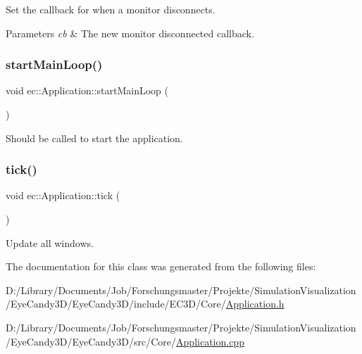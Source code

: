 Set the callback for when a monitor disconnects. 


\begin{DoxyParams}{Parameters}
{\em cb} & The new monitor disconnected callback. \\
\hline
\end{DoxyParams}
\mbox{\label{classec_1_1_application_ad541044a8fc0ff8d6c3fc57220109a50}} 
\subsubsection{\texorpdfstring{start\+Main\+Loop()}{startMainLoop()}}
{\footnotesize\ttfamily void ec\+::\+Application\+::start\+Main\+Loop (\begin{DoxyParamCaption}{ }\end{DoxyParamCaption})\hspace{0.3cm}{\ttfamily [virtual]}}



Should be called to start the application. 

\mbox{\label{classec_1_1_application_a036ae53bcbf708c7a01deb199feeccdf}} 
\subsubsection{\texorpdfstring{tick()}{tick()}}
{\footnotesize\ttfamily void ec\+::\+Application\+::tick (\begin{DoxyParamCaption}{ }\end{DoxyParamCaption})\hspace{0.3cm}{\ttfamily [virtual]}}



Update all windows. 



The documentation for this class was generated from the following files\+:\begin{DoxyCompactItemize}
\item 
D\+:/\+Library/\+Documents/\+Job/\+Forschungsmaster/\+Projekte/\+Simulation\+Visualization/\+Eye\+Candy3\+D/\+Eye\+Candy3\+D/include/\+E\+C3\+D/\+Core/\mbox{\hyperlink{_application_8h}{Application.\+h}}\item 
D\+:/\+Library/\+Documents/\+Job/\+Forschungsmaster/\+Projekte/\+Simulation\+Visualization/\+Eye\+Candy3\+D/\+Eye\+Candy3\+D/src/\+Core/\mbox{\hyperlink{_application_8cpp}{Application.\+cpp}}\end{DoxyCompactItemize}

